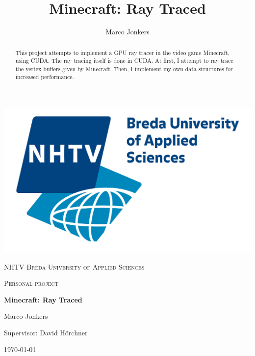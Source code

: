 \documentclass[]{article}
\title{Minecraft: Ray Traced}
\author{Marco Jonkers}
\begin{document}

\begin{titlepage}
  \centering
  \includegraphics[scale=0.5]{eng_logofc_uas.jpg}\par\vspace{1cm}
  {\scshape\LARGE NHTV Breda University of Applied Sciences\par}
  \vspace{1cm}
  {\scshape\Large Personal project\par}
  \vspace{1.5cm}
  {\huge\bfseries Minecraft: Ray Traced\par}
  \vspace{2cm}
  {\Large Marco Jonkers\par}
  \vspace{0.5cm}
  {Supervisor: David H{\"o}rchner\par}

  
  \vspace{2cm}
  
  \begin{abstract}
    This project attempts to implement a GPU ray tracer in the video game Minecraft, using CUDA.
    The ray tracing itself is done in CUDA. At first, I attempt to ray trace the vertex buffers given by Minecraft. Then, I implement my own data structures for increased performance.
  \end{abstract}
  
  \vfill
  
  {\large \today\par}
\end{titlepage}
\end{document}
